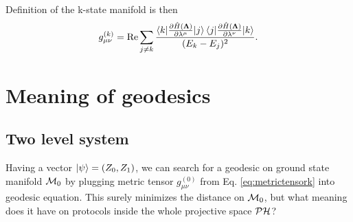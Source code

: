 Definition of the k-state manifold is then
\begin{equation}
    g_{\mu\nu}^{(k)} = \text{Re} \sum_{j\neq k}\frac{\braket{k|\frac{\partial \hat{H}({\bm\Lambda})}{\partial \lambda^\mu}|j}\braket{j|\frac{\partial \hat{H}({\bm\Lambda})}{\partial \lambda^\nu}|k}}{(E_k-E_j)^2}.
    \label{eq:metrictensork}
\end{equation}



\section{Meaning of geodesics}

\subsection{Two level system}
Having a vector $\ket{\psi}=(Z_0,Z_1)$, we can search for a geodesic on ground state manifold $\mathcal{M}_0$ by plugging metric tensor $g^(0)_{\mu\nu}$ from Eq. \ref{eq:metrictensork} into geodesic equation. This surely minimizes the distance on $\mathcal{M}_0$, but what meaning does it have on protocols inside the whole projective space $\mathcal{PH}$? 

